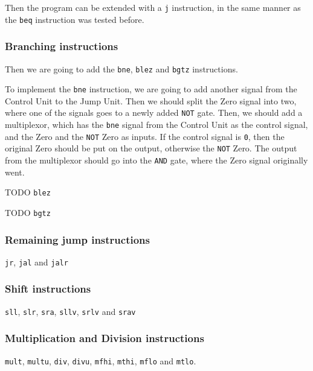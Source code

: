Then the program can be extended with a \texttt{j} instruction, in the same
manner as the \texttt{beq} instruction was tested before.

\subsubsection*{Branching instructions}
Then we are going to add the \texttt{bne}, \texttt{blez} and \texttt{bgtz}
instructions.

To implement the \texttt{bne} instruction, we are going to add another signal
from the Control Unit to the Jump Unit. Then we should split the Zero signal
into two, where one of the signals goes to a newly added \texttt{NOT} gate.
Then, we should add a multiplexor, which has the \texttt{bne} signal from the
Control Unit as the control signal, and the Zero and the \texttt{NOT} Zero as
inputs. If the control signal is \texttt{0}, then the original Zero should be
put on the output, otherwise the \texttt{NOT} Zero.  The output from the
multiplexor should go into the \texttt{AND} gate, where the Zero signal
originally went.

TODO \texttt{blez}

TODO \texttt{bgtz}

\subsubsection*{Remaining jump instructions}
\texttt{jr}, \texttt{jal} and \texttt{jalr}

\subsubsection*{Shift instructions}
\texttt{sll}, \texttt{slr}, \texttt{sra}, \texttt{sllv}, \texttt{srlv} and
\texttt{srav}

\subsubsection*{Multiplication and Division instructions}
\texttt{mult}, \texttt{multu}, \texttt{div}, \texttt{divu}, \texttt{mfhi},
\texttt{mthi}, \texttt{mflo} and \texttt{mtlo}.

